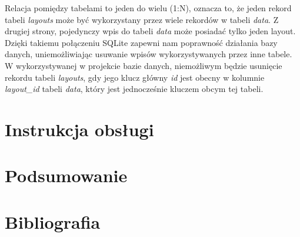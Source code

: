 \documentclass[a4paper,12pt, twoside]{article}
\begin{document}
    Relacja pomiędzy tabelami to jeden do wielu (1:N), oznacza to, że jeden rekord tabeli \textit{layouts} może być wykorzystany przez wiele rekordów w tabeli \textit{data}. Z drugiej strony, pojedynczy wpis do tabeli \textit{data} może posiadać tylko jeden layout. Dzięki takiemu połączeniu SQLite zapewni nam poprawność działania bazy danych, uniemożliwiając usuwanie wpisów wykorzystywanych przez inne tabele. W wykorzystywanej w projekcie bazie danych, niemożliwym będzie usunięcie rekordu tabeli \textit{layouts}, gdy jego klucz główny \textit{id} jest obecny w kolumnie \textit{layout\_id} tabeli \textit{data}, który jest jednocześnie kluczem obcym tej tabeli. 
	
	\section{Instrukcja obsługi}
	\section{Podsumowanie}
	
	\newpage
	\section{Bibliografia}
	
\end{document}
